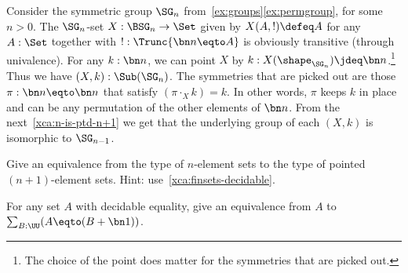 \begin{example}
  \label{exa:fix1subSGn}%
  Consider the symmetric group $\SG_n$ from~\cref{ex:groups}\ref{ex:permgroup},
  for some $n>0$. The $\SG_n$-set $X : \BSG_n \to\Set$ given by $X(A,!)\defeq A$
  for any $A:\Set$ together with $! : \Trunc{\bn n  \eqto A}$ is obviously transitive
  (through univalence).  For any $k:\bn n$, we can point $X$ by
  $k: X(\sh_{\SG_n}) \jdeq \bn n$.\footnote{The choice of the point does matter
    for the symmetries that are picked out.}  Thus we have $(X,k):\Sub(\SG_n)$.
  The symmetries that are picked out are those $\pi : \bn n \eqto \bn n$ that
  satisfy $(\pi \cdot_X k) = k$. %
  In other words, $\pi$ keeps $k$ in place and can be any
  permutation of the other elements of $\bn n$.  From the
  next~\cref{xca:n-is-ptd-n+1} we get that the underlying group of each $(X,k)$
  is isomorphic to $\SG_{n-1}$.
\end{example}

\begin{xca}\label{xca:n-is-ptd-n+1}
  Give an equivalence from the type of
  $n$-element sets to the type of pointed $(n{+}1)$-element sets.
  Hint: use~\cref{xca:finsets-decidable}.
\end{xca}

\begin{xca} \label{xca:A-is-A-1+1}
  For any set $A$ with decidable equality, give
  an equivalence from $A$ to $\sum_{B:\UU}(A\eqto(B+\bn1))$.
\end{xca}

